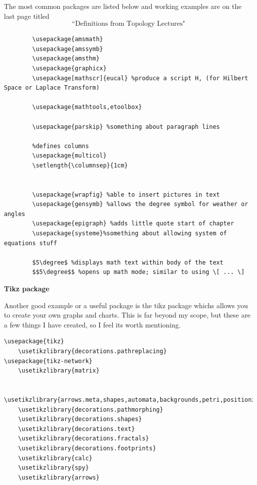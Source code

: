 \documentclass[12pt, letterpaper]{report}
\newcounter{defi}[chapter] \setcounter{defi}{0}
\newcommand{\0}{\emptyset}
\theoremstyle{theorem}
\theoremstyle{definition}
\theoremstyle{definition}
\theoremstyle{definition}
\theoremstyle{definition}
\theoremstyle{theorem}
\theoremstyle{theorem}
\theoremstyle{remark}
\begin{document}
The most common packages are listed below and working examples are on the last page titled $$\mbox{``Definitions from Topology Lectures"} $$

	\begin{lstlisting}
		\usepackage{amsmath}
		\usepackage{amssymb}
		\usepackage{amsthm}
		\usepackage{graphicx}
		\usepackage[mathscr]{eucal} %produce a script H, (for Hilbert Space or Laplace Transform)
		
		\usepackage{mathtools,etoolbox}

		\usepackage{parskip} %something about paragraph lines
		
		%defines columns
		\usepackage{multicol}
		\setlength{\columnsep}{1cm}


		\usepackage{wrapfig} %able to insert pictures in text
		\usepackage{gensymb} %allows the degree symbol for weather or angles
		\usepackage{epigraph} %adds little quote start of chapter
		\usepackage{systeme}%something about allowing system of equations stuff
		
		$5\degree$ %displays math text within body of the text
		$$5\degree$$ %opens up math mode; similar to using \[ ... \]
	\end{lstlisting}



\newpage

\textbf{Tikz package}

Another good example or a useful package is the tikz package whichs allows you to create your own graphs and charts.  This is far beyond my scope, but these are a few things I have created, so I feel its worth mentioning.

	\begin{lstlisting}
\usepackage{tikz}
	\usetikzlibrary{decorations.pathreplacing}
\usepackage{tikz-network}
	\usetikzlibrary{matrix}

	\usetikzlibrary{arrows.meta,shapes,automata,backgrounds,petri,positioning}
	\usetikzlibrary{decorations.pathmorphing}
	\usetikzlibrary{decorations.shapes}
	\usetikzlibrary{decorations.text}
	\usetikzlibrary{decorations.fractals}
	\usetikzlibrary{decorations.footprints}
	\usetikzlibrary{calc}
	\usetikzlibrary{spy}
	\usetikzlibrary{arrows}

	\end{lstlisting}
	
	
\end{document}
